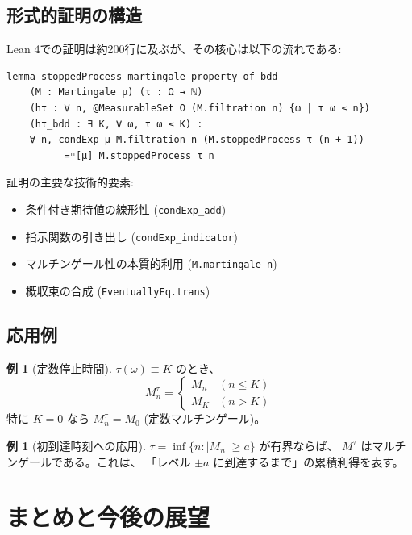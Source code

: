 \documentclass[a4paper,12pt]{ltjsarticle}
\theoremstyle{definition}
\newtheorem{example}[definition]{例}
\begin{document}
\subsection{形式的証明の構造}

Lean 4での証明は約200行に及ぶが、その核心は以下の流れである:

\begin{codebox}
\small
\begin{verbatim}
lemma stoppedProcess_martingale_property_of_bdd
    (M : Martingale μ) (τ : Ω → ℕ)
    (hτ : ∀ n, @MeasurableSet Ω (M.filtration n) {ω | τ ω ≤ n})
    (hτ_bdd : ∃ K, ∀ ω, τ ω ≤ K) :
    ∀ n, condExp μ M.filtration n (M.stoppedProcess τ (n + 1))
          =ᵐ[μ] M.stoppedProcess τ n
\end{verbatim}
\end{codebox}

証明の主要な技術的要素:
\begin{itemize}
\item 条件付き期待値の線形性 (\texttt{condExp\_add})
\item 指示関数の引き出し (\texttt{condExp\_indicator})
\item マルチンゲール性の本質的利用 (\texttt{M.martingale n})
\item 概収束の合成 (\texttt{EventuallyEq.trans})
\end{itemize}

\subsection{応用例}

\begin{example}[定数停止時間]
$\tau(\omega) \equiv K$ のとき、
\[
M^\tau_n = \begin{cases}
M_n & (n \leq K) \\
M_K & (n > K)
\end{cases}
\]
特に $K=0$ なら $M^\tau_n = M_0$ (定数マルチンゲール)。
\end{example}

\begin{example}[初到達時刻への応用]
$\tau = \inf\{n : |M_n| \geq a\}$ が有界ならば、
$M^\tau$ はマルチンゲールである。これは、
「レベル $\pm a$ に到達するまで」の累積利得を表す。
\end{example}

\section{まとめと今後の展望}
\end{document}
